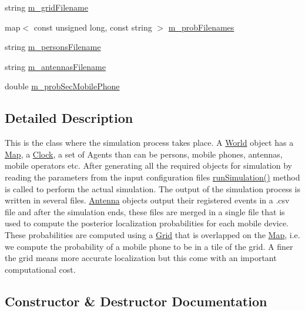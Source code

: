 \begin{DoxyCompactItemize}
\item 
string \mbox{\hyperlink{class_world_a91e15a41a1a885770916c6b560883d5f}{m\+\_\+grid\+Filename}}
\item 
map$<$ const unsigned long, const string $>$ \mbox{\hyperlink{class_world_afec4433aef7c6e667c669b83a62695ea}{m\+\_\+prob\+Filenames}}
\item 
string \mbox{\hyperlink{class_world_a66e68ec2220ea27e705aac88a920b6fd}{m\+\_\+persons\+Filename}}
\item 
string \mbox{\hyperlink{class_world_ac38e4d56d6bcabc35cf0e6763892a7a2}{m\+\_\+antennas\+Filename}}
\item 
double \mbox{\hyperlink{class_world_a45e13597d542b7f2eb0b0d77e1a8633f}{m\+\_\+prob\+Sec\+Mobile\+Phone}}
\end{DoxyCompactItemize}


\subsection{Detailed Description}
This is the class where the simulation process takes place. A \mbox{\hyperlink{class_world}{World}} object has a \mbox{\hyperlink{class_map}{Map}}, a \mbox{\hyperlink{class_clock}{Clock}}, a set of Agents than can be persons, mobile phones, antennas, mobile operators etc. After generating all the required objects for simulation by reading the parameters from the input configuration files \mbox{\hyperlink{class_world_aa825a43f968c8fe750c67156e64721ff}{run\+Simulation()}} method is called to perform the actual simulation. The output of the simulation process is written in several files. \mbox{\hyperlink{class_antenna}{Antenna}} objects output their registered events in a .csv file and after the simulation ends, these files are merged in a single file that is used to compute the posterior localization probabilities for each mobile device. These probabilities are computed using a \mbox{\hyperlink{class_grid}{Grid}} that is overlapped on the \mbox{\hyperlink{class_map}{Map}}, i.\+e. we compute the probability of a mobile phone to be in a tile of the grid. A finer the grid means more accurate localization but this come with an important computational cost. 

\subsection{Constructor \& Destructor Documentation}
\mbox{\label{class_world_a94871f094bb3eabb67f5bd1b10396832}} 
